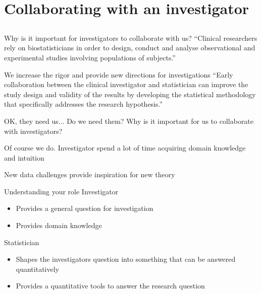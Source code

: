\documentclass[14pt]{beamer}
\begin{document}
\section{Collaborating with an investigator}

\subsection*{}

\begin{frame}{Why is it important for investigators to collaborate 
with us?}
``Clinical researchers rely on biostatisticians in order to design, conduct and 
analyse observational and experimental studies involving populations of 
subjects.'' \citep{Bangdiwala2001}
\end{frame}

\begin{frame}{We increase the rigor and provide new directions
for investigations}
``Early collaboration between the clinical investigator and statistician can 
improve the study design and validity of the results by developing the 
statistical methodology that specifically addresses the research hypothesis.''
\cite{Adams2009}
\end{frame}

\begin{frame}{OK, they need us...  Do we need them?}
Why is it important for us to collaborate with investigators?
\end{frame}

\begin{frame}{Of course we do.}
Investigator spend a lot of time acquiring domain knowledge and intuition

\vspace{0.5cm}

New data challenges provide inspiration for new theory
\end{frame}

\begin{frame}{Understanding your role}
Investigator
\begin{itemize}
\item Provides a general question for investigation
\item Provides domain knowledge
\end{itemize}
Statistician
\begin{itemize}
\item Shapes the investigators question into something that can be answered
  quantitatively
\item Provides a quantitative tools to answer the research question
\end{itemize}
\end{frame}
\end{document}
